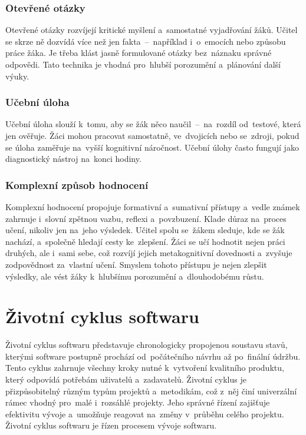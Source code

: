 \documentclass[male,czech,api_bc]{kitheses}
\begin{document}
\subsubsection{Otevřené otázky}

Otevřené otázky rozvíjejí kritické myšlení a~samostatné vyjadřování žáků. Učitel se skrze ně dozvídá více než jen fakta~--~například i~o~emocích nebo způsobu práce žáka. Je třeba klást jasně formulované otázky bez~náznaku správné odpovědi. Tato technika je vhodná pro~hlubší porozumění a~plánování další výuky.

\subsubsection{Učební úloha}

Učební úloha slouží k~tomu, aby se žák něco naučil~--~na~rozdíl od~testové, která jen ověřuje. Žáci mohou pracovat samostatně, ve~dvojicích nebo se~zdroji, pokud se úloha zaměřuje na~vyšší kognitivní náročnost. Učební úlohy často fungují jako diagnostický nástroj na~konci hodiny.

\subsubsection{Komplexní způsob hodnocení}

Komplexní hodnocení propojuje formativní a~sumativní přístupy a~vedle známek zahrnuje i~slovní zpětnou vazbu, reflexi a~povzbuzení. Klade důraz na~proces učení, nikoliv jen na~jeho výsledek. Učitel spolu se~žákem sleduje, kde se žák nachází, a~společně hledají cesty ke~zlepšení. Žáci se učí hodnotit nejen práci druhých, ale i~sami sebe, což rozvíjí jejich metakognitivní dovednosti a~zvyšuje zodpovědnost za~vlastní učení. Smyslem tohoto přístupu je nejen zlepšit výsledky, ale vést žáky k~hlubšímu porozumění a~dlouhodobému růstu.


\section{Životní cyklus softwaru}

Životní cyklus softwaru představuje chronologicky propojenou soustavu stavů, kterými software postupně prochází od~počátečního návrhu až po~finální údržbu. Tento cyklus zahrnuje všechny kroky nutné k~vytvoření kvalitního produktu, který odpovídá potřebám uživatelů a~zadavatelů. Životní cyklus je přizpůsobitelný různým typům projektů a~metodikám, což z~něj činí univerzální rámec vhodný pro~malé i~rozsáhlé projekty. Jeho správné řízení zajišťuje efektivitu vývoje a~umožňuje reagovat na~změny v~průběhu celého projektu. Životní cyklus softwaru je řízen procesem vývoje softwaru.
\end{document}
